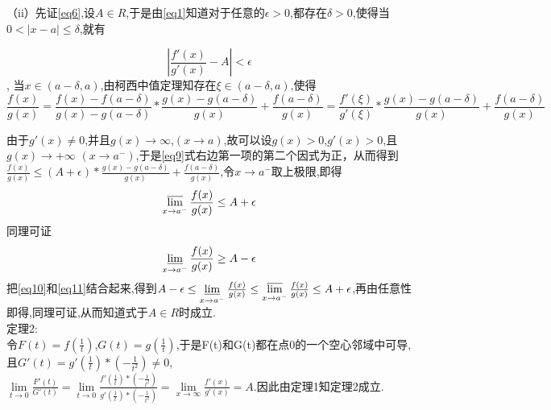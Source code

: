 \documentclass{ctexart}
\begin{document}
（ii）先证\eqref{eq6},设$A \in R$,于是由\eqref{eq1}知道对于任意的$\epsilon > 0$,都存在$\delta > 0$,使得当$0<|x-a| \leq \delta$,就有

\begin{equation}
  |\frac{f'(x)}{g'(x)}-A|<\epsilon\label{eq8}
  \end{equation},
当$x \in (a-\delta,a)$,由柯西中值定理知存在$\xi \in (a-\delta,a)$,使得
\begin{equation}
  \frac{f(x)}{g(x)}=\frac{f(x)-f(a-\delta)}{g(x)-g(a-\delta)}*\frac{g(x)-g(a-\delta)}{g(x)}+\frac{f(a-\delta)}{g(x)}=\frac{f'(\xi)}{g'(\xi)}*\frac{g(x)-g(a-\delta)}{g(x)}+\frac{f(a-\delta)}{g(x)}\label{eq9}
\end{equation}

由于$g'(x) \neq 0$,并且$g(x) \to \infty$,$(x \to a)$,故可以设$ g(x)>0 $,$g'(x)>0$,且$g(x) \to +\infty$ $(x \to a^-)$,于是\eqref{eq9}式右边第一项的第二个因式为正，从而得到$\frac{f(x)}{g(x)} \leq(A+\epsilon)*\frac{g(x)-g(a-\delta)}{g(x)}+\frac{f(a-\delta)}{g(x)}$,令$x \to a^- $取上极限,即得
\begin{equation}
  \varlimsup\limits_{x \to a^-}\frac{f(x)}{g(x)} \leq A+\epsilon\label{eq10}
  \end{equation}
同理可证
\begin{equation}
  \varliminf\limits_{x \to a^-}\frac{f(x)}{g(x)} \geq A-\epsilon\label{eq11}
  \end{equation}
把\eqref{eq10}和\eqref{eq11}结合起来,得到$A-\epsilon \leq \varliminf\limits_{x \to a^-}\frac{f(x)}{g(x)} \leq \varlimsup\limits_{x \to a^-}\frac{f(x)}{g(x)} \leq A+\epsilon $,再由任意性即得,同理可证,从而知道式于$A \in R$时成立.\\
定理2:\\
令$F(t)=f(\frac{1}{t})$,$G(t)=g(\frac{1}{t})$,于是F(t)和G(t)都在点0的一个空心邻域中可导,且$G'(t)=g'(\frac{1}{t})*(-\frac{1}{t^2}) \neq 0$,$\lim\limits_{t \to 0}\frac{F'(t)}{G'(t)}=\lim\limits_{t \to 0}\frac{f'(\frac{1}{t})*(-\frac{1}{t^2})}{g'(\frac{1}{t})*(-\frac{1}{t^2})}=\lim\limits_{x \to \infty}\frac{f'(x)}{g'(x)}=A$.因此由定理1知定理2成立.
\end{document}
